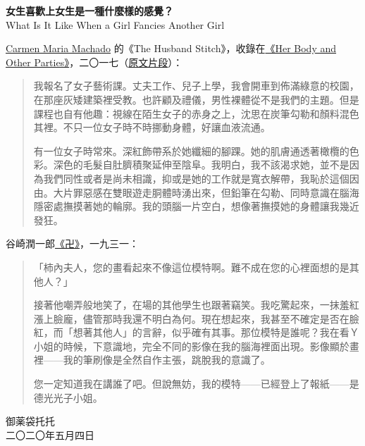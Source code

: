 \documentclass[10pt]{article}
\begin{document}
\begin{flushleft}
\textbf{女生喜歡上女生是一種什麼樣的感覺？}\\
What Is It Like When a Girl Fancies Another Girl\\
\end{flushleft}
\vspace{3em}

\href{https://carmenmariamachado.com}{Carmen Maria Machado} 的《The
Husband
Stitch》，收錄在\href{https://www.amazon.com/Her-Body-Other-Parties-Stories/dp/155597788X}{《Her
Body and Other
Parties》}，二〇一七（\href{https://telegra.ph/The-Husband-Stitch-04-12}{原文片段}）：

\begin{quote}
我報名了女子藝術課。丈夫工作、兒子上學，我會開車到佈滿綠意的校園，在那座灰矮建築裡受教。也許顧及禮儀，男性裸體從不是我們的主題。但是課程也自有他趣：視線在陌生女子的赤身之上，沈思在炭筆勾勒和顏料混色其裡。不只一位女子時不時挪動身體，好讓血液流通。

有一位女子時常來。深紅飾帶系於她纖細的腳踝。她的肌膚通透著橄欖的色彩。深色的毛髮自肚臍積聚延伸至陰阜。我明白，我不該渴求她，並不是因為我們同性或者是尚未相識，抑或是她的工作就是寬衣解帶，我恥於這個因由。大片罪惡感在雙眼遊走胴體時湧出來，但鉛筆在勾勒、同時意識在腦海隱密處撫摸著她的輪廓。我的頭腦一片空白，想像著撫摸她的身體讓我幾近發狂。
\end{quote}

谷崎潤一郎\href{https://ja.wikipedia.org/wiki/\%E5\%8D\%8D_(\%E5\%B0\%8F\%E8\%AA\%AC)}{《卍》}，一九三一：

\begin{quote}
「柿內夫人，您的畫看起來不像這位模特啊。難不成在您的心裡面想的是其他人？」

接著他嘲弄般地笑了，在場的其他學生也跟著竊笑。我吃驚起來，一抹羞紅漲上臉龐，儘管那時我還不明白為何。現在想起來，我甚至不確定是否在臉紅，而「想著其他人」的言辭，似乎確有其事。那位模特是誰呢？我在看Ｙ小姐的時候，下意識地，完全不同的影像在我的腦海裡面出現。影像顯於畫裡{——}我的筆刷像是全然自作主張，跳脫我的意識了。

您一定知道我在講誰了吧。但說無妨，我的模特{——}已經登上了報紙{——}是德光光子小姐。
\end{quote}

\vspace{3em}
\begin{flushleft}
\small{御薬袋托托\\
二〇二〇年五月四日}
\end{flushleft}
\end{document}
